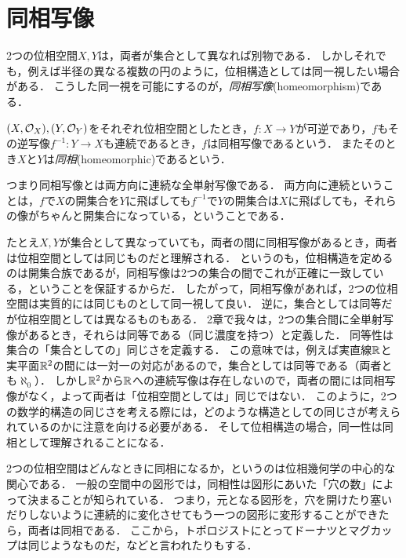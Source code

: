 \documentclass[11pt,a4paper]{jsarticle}
\begin{document}
\section{同相写像}
2つの位相空間$X, Y$は，両者が集合として異なれば別物である．
しかしそれでも，例えば半径の異なる複数の円のように，位相構造としては同一視したい場合がある．
こうした同一視を可能にするのが，\emph{同相写像}(homeomorphism)である．

\begin{dfn}[同相写像]
$(X, \mathcal{O}_X), (Y, \mathcal{O}_Y)$をそれぞれ位相空間としたとき，$f:X \to Y$が可逆であり，$f$もその逆写像$f^{-1}:Y \to X$も連続であるとき，$f$は同相写像であるという．
またそのとき$X$と$Y$は\emph{同相}(homeomorphic)であるという．
\end{dfn}

つまり同相写像とは両方向に連続な全単射写像である．
両方向に連続ということは，$f$で$X$の開集合を$Y$に飛ばしても$f^{-1}$で$Y$の開集合は$X$に飛ばしても，それらの像がちゃんと開集合になっている，ということである．

たとえ$X, Y$が集合として異なっていても，両者の間に同相写像があるとき，両者は位相空間としては同じものだと理解される．
というのも，位相構造を定めるのは開集合族であるが，同相写像は2つの集合の間でこれが正確に一致している，ということを保証するからだ．
したがって，同相写像があれば，2つの位相空間は実質的には同じものとして同一視して良い．
逆に，集合としては同等だが位相空間としては異なるものもある．
2章で我々は，2つの集合間に全単射写像があるとき，それらは同等である（同じ濃度を持つ）と定義した．
同等性は集合の「集合としての」同じさを定義する．
この意味では，例えば実直線$\mathbb{R}$と実平面$\mathbb{R}^2$の間には一対一の対応があるので，集合としては同等である（両者とも$\aleph_0$）．
しかし$\mathbb{R}^2$から$\mathbb{R}$への連続写像は存在しないので，両者の間には同相写像がなく，よって両者は「位相空間としては」同じではない．
このように，2つの数学的構造の同じさを考える際には，どのような構造としての同じさが考えられているのかに注意を向ける必要がある．
そして位相構造の場合，同一性は同相として理解されることになる．


\begin{develop}
2つの位相空間はどんなときに同相になるか，というのは位相幾何学の中心的な関心である．
一般の空間中の図形では，同相性は図形にあいた「穴の数」によって決まることが知られている．
つまり，元となる図形を，穴を開けたり塞いだりしないように連続的に変化させてもう一つの図形に変形することができたら，両者は同相である．
ここから，トポロジストにとってドーナツとマグカップは同じようなものだ，などと言われたりもする．
\end{develop}
\end{document}
